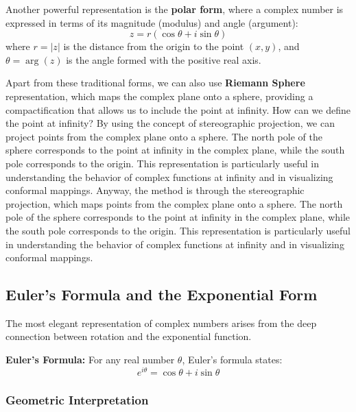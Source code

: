 Another powerful representation is the \textbf{polar form}, where a complex number is expressed in terms of its magnitude (modulus) and angle (argument):
\begin{equation}
    z = r(\cos \theta + i \sin \theta)
\end{equation}
where $r = |z|$ is the distance from the origin to the point $(x, y)$, and $\theta = \arg(z)$ is the angle formed with the positive real axis.

Apart from these traditional forms, we can also use \textbf{Riemann Sphere} representation, which maps the complex plane onto a sphere, providing a compactification that allows us to include the point at infinity. How can we define the point at infinity? By using the concept of stereographic projection, we can project points from the complex plane onto a sphere. The north pole of the sphere corresponds to the point at infinity in the complex plane, while the south pole corresponds to the origin. This representation is particularly useful in understanding the behavior of complex functions at infinity and in visualizing conformal mappings. Anyway, the method is through the stereographic projection, which maps points from the complex plane onto a sphere. The north pole of the sphere corresponds to the point at infinity in the complex plane, while the south pole corresponds to the origin. This representation is particularly useful in understanding the behavior of complex functions at infinity and in visualizing conformal mappings.



\subsection{Euler's Formula and the Exponential Form}

The most elegant representation of complex numbers arises from the deep connection between rotation and the exponential function.

\textbf{Euler's Formula:} For any real number $\theta$, Euler's formula states:
\begin{equation}
    e^{i\theta} = \cos \theta + i\sin \theta
\end{equation}

\subsubsection{Geometric Interpretation}

